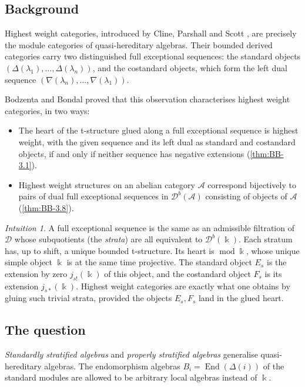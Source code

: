 \documentclass[11pt,reqno]{amsart}
\theoremstyle{plain}
\theoremstyle{definition}
\theoremstyle{remark}
\newtheorem*{intuition}{Intuition}
\newcommand{\kk}{\Bbbk}
\DeclareMathOperator{\End}{End}
\newcommand{\modd}{\operatorname{mod}}
\newcommand{\Db}{\mathcal{D}^b}
\newcommand{\cD}{\mathcal{D}}
\newcommand{\cA}{\mathcal{A}}
\begin{document}
\subsection{Background}
Highest weight categories, introduced by Cline, Parshall and Scott \cite{CPS88}, are precisely the module categories of quasi-hereditary algebras. Their bounded derived categories carry two distinguished full exceptional sequences: the standard objects $(\Delta(\lambda_1),\dots,\Delta(\lambda_n))$, and the costandard objects, which form the left dual sequence $(\nabla(\lambda_n),\dots,\nabla(\lambda_1))$.

Bodzenta and Bondal \cite{BB26} proved that this observation characterises highest weight categories, in two ways:
\begin{itemize}
\item The heart of the t-structure glued along a full exceptional sequence is highest weight, with the given sequence and its left dual as standard and costandard objects, if and only if neither sequence has negative extensions (\cref{thm:BB-3.1}).
\item Highest weight structures on an abelian category $\cA$ correspond bijectively to pairs of dual full exceptional sequences in $\Db(\cA)$ consisting of objects of $\cA$ (\cref{thm:BB-3.8}).
\end{itemize}

\begin{intuition}
A full exceptional sequence is the same as an admissible filtration of $\cD$ whose subquotients (the \emph{strata}) are all equivalent to $\Db(\kk)$. Each stratum has, up to shift, a unique bounded t-structure. Its heart is $\modd\kk$, whose unique simple object $\kk$ is at the same time projective. The standard object $E_s$ is the extension by zero $j_{s!}(\kk)$ of this object, and the costandard object $F_s$ is its extension $j_{s*}(\kk)$. Highest weight categories are exactly what one obtains by gluing such trivial strata, provided the objects $E_s,F_s$ land in the glued heart.
\end{intuition}

\subsection{The question}
\emph{Standardly stratified algebras} and \emph{properly stratified algebras} \cite{CPS96,Dla96,AHLU00} generalise quasi-hereditary algebras. The endomorphism algebras $B_i=\End(\Delta(i))$ of the standard modules are allowed to be arbitrary local algebras instead of $\kk$.
\end{document}
